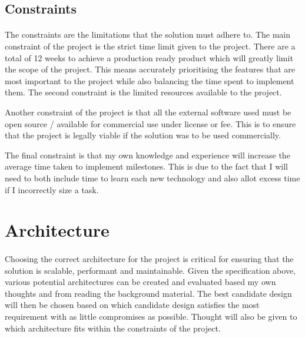 \documentclass[12pt, conference, final, a4paper, onecolumn, compsoc]{IEEEtran}
\begin{document}
\subsection*{Constraints}
\paragraph{}

The constraints are the limitations that the solution must adhere to. The main
constraint of the project is the strict time limit given to the project. There
are a total of 12 weeks to achieve a production ready product which will greatly
limit the scope of the project. This means accurately prioritising the features
that are most important to the project while also balancing the time spent to
implement them. The second constraint is the limited resources available to the
project.


Another constraint of the project is that all the external software used must be
open source / available for commercial use under license or fee. This is to
ensure that the project is legally viable if the solution was to be used
commercially.

The final constraint is that my own knowledge and experience will increase the
average time taken to implement milestones. This is due to the fact that I will
need to both include time to learn each new technology and also allot excess
time if I incorrectly size a task.


\section{Architecture}

\paragraph{}
Choosing the correct architecture for the project is critical for ensuring that
the solution is scalable, performant and maintainable. Given the specification
above, various potential architectures can be created and evaluated based my own
thoughts and from reading the background material. The best candidate design
will then be chosen based on which candidate design satisfies the most
requirement with as little compromises as possible. Thought will also be given
to which architecture fits within the constraints of the project.

\end{document}
